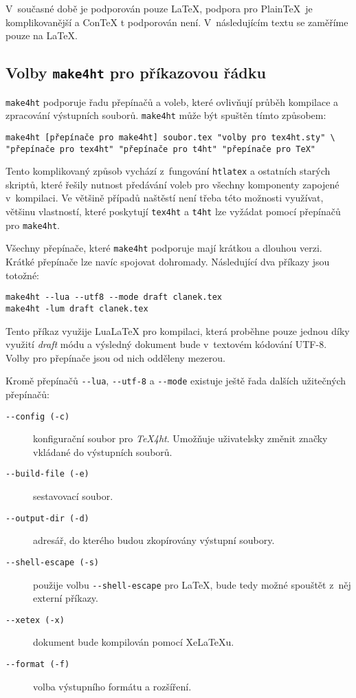 \documentclass{csbulletin}
\newcommand\nazev[1]{\textit{#1}}
\newcommand\prikaz[1]{\texttt{#1}}
\newcommand\prepinac[1]{\texttt{-\/-#1}}
\begin{document}
V~současné době je podporován pouze \LaTeX, podpora pro Plain\TeX\ je
komplikovanější a Con\TeX{} t podporován není. V~následujícím textu
se zaměříme pouze na \LaTeX.

\subsection{Volby \prikaz{make4ht} pro příkazovou řádku}

\prikaz{make4ht} podporuje řadu přepínačů a voleb, které ovlivňují průběh kompilace a zpracování výstupních souborů. \prikaz{make4ht} může být spuštěn tímto způsobem:

\begingroup
\small
\begin{verbatim}
make4ht [přepínače pro make4ht] soubor.tex "volby pro tex4ht.sty" \
"přepínače pro tex4ht" "přepínače pro t4ht" "přepínače pro TeX"
\end{verbatim}
\endgroup

Tento komplikovaný způsob vychází z~fungování \prikaz{htlatex} a ostatních
starých skriptů, které řešily nutnost předávání voleb pro všechny komponenty
zapojené v~kompilaci. Ve většině případů naštěstí není třeba této možnosti
využívat, většinu vlastností, které poskytují \prikaz{tex4ht} a \prikaz{t4ht}
lze vyžádat pomocí přepínačů pro \prikaz{make4ht}.

Všechny přepínače, které \prikaz{make4ht} podporuje mají krátkou a dlouhou
verzi. Krátké přepínače lze navíc spojovat dohromady. Následující dva příkazy
jsou totožné:

\begin{verbatim}
make4ht --lua --utf8 --mode draft clanek.tex
make4ht -lum draft clanek.tex
\end{verbatim}

Tento příkaz využije Lua\LaTeX{} pro kompilaci, která proběhne pouze jednou díky
využití \nazev{draft} módu a výsledný dokument bude v~textovém kódování UTF-8.
Volby pro přepínače jsou od nich odděleny mezerou.

Kromě přepínačů \prepinac{lua}, \prepinac{utf-8} a \prepinac{mode} existuje ještě řada dalších užitečných přepínačů:

\begin{description}
  \item[\prepinac{config (-c)}] konfigurační soubor pro \nazev{TeX4ht}. Umožňuje uživatelsky změnit značky vkládané do výstupních souborů.
  \item[\prepinac{build-file (-e)}] sestavovací soubor.
  \item[\prepinac{output-dir (-d)}] adresář, do kterého budou zkopírovány výstupní soubory.
  \item[\prepinac{shell-escape (-s)}] použije volbu \verb|--shell-escape| pro \LaTeX, bude tedy možné spouštět z~něj externí příkazy.
  \item[\prepinac{xetex (-x)}] dokument bude kompilován pomocí Xe\LaTeX u.
  \item[\prepinac{format (-f)}] volba výstupního formátu a rozšíření.
\end{description}
\end{document}
